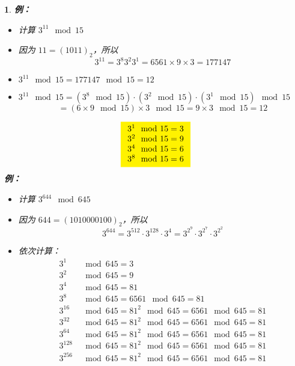 \documentclass[UTF8]{report}
\theoremstyle{MyLineTheoremStyle} %
\theoremstyle{MyBlockTheoremStyle} %
\theoremstyle{MySubsubsectionStyle} %
\newtheorem{definition}{}
\begin{document}
\begin{definition}
    \textbf{例：}
    \begin{itemize}
        \item 计算 $3^{11} \mod 15$
        \item 因为 $11 = (1011)_2$，所以
        \[
        3^{11} = 3^{8} 3^{2} 3^{1} = 6561 \times 9 \times 3 = 177147
        \]
        \item $3^{11} \mod 15 = 177147 \mod 15 = 12$
        \item $3^{11} \mod 15 = (3^{8} \mod 15) \cdot (3^{2} \mod 15) \cdot (3^{1} \mod 15) \mod 15$
        \[
        = (6 \times 9 \mod 15) \times 3 \mod 15 = 9 \times 3 \mod 15 = 12
        \]
    \end{itemize}
    \[
        \colorbox{yellow}{$
            \begin{array}{l}
                3^1 \mod 15 = 3 \\
                3^2 \mod 15 = 9 \\
                3^4 \mod 15 = 6 \\
                3^8 \mod 15 = 6
            \end{array}
        $}
        \]
    \textbf{例：}
    \begin{itemize}
                \item 计算 $3^{644} \mod 645$
                \item 因为 $644 = (1010000100)_2$，所以
                \[
                3^{644} = 3^{512} \cdot 3^{128} \cdot 3^4 = 3^{2^9} \cdot 3^{2^7} \cdot 3^{2^2}
                \]
                \item 依次计算：
                \[
                \begin{aligned}
                    3^1 &\mod 645 = 3 \\
                    3^2 &\mod 645 = 9 \\
                    3^4 &\mod 645 = 81 \\
                    3^8 &\mod 645 = 6561 \mod 645 = 81 \\
                    3^{16} &\mod 645 = 81^2 \mod 645 = 6561 \mod 645 = 81 \\
                    3^{32} &\mod 645 = 81^2 \mod 645 = 6561 \mod 645 = 81 \\
                    3^{64} &\mod 645 = 81^2 \mod 645 = 6561 \mod 645 = 81 \\
                    3^{128} &\mod 645 = 81^2 \mod 645 = 6561 \mod 645 = 81 \\
                    3^{256} &\mod 645 = 81^2 \mod 645 = 6561 \mod 645 = 81 \\

\end{aligned}\]
\end{itemize}
\end{definition}
\end{document}
